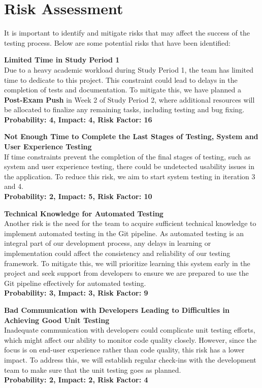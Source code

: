 \documentclass{article}
\begin{document}
\section{Risk Assessment}
It is important to identify and mitigate risks that may affect the success of the testing process. Below are some potential risks that have been identified:

\textbf{Limited Time in Study Period 1}\\
Due to a heavy academic workload during Study Period 1, the team has limited time to dedicate to this project. This constraint could lead to delays in the completion of tests and documentation. To mitigate this, we have planned a \textbf{Post-Exam Push} in Week 2 of Study Period 2, where additional resources will be allocated to finalize any remaining tasks, including testing and bug fixing.\\
\textbf{Probability: 4, Impact: 4, Risk Factor: 16}


\textbf{Not Enough Time to Complete the Last Stages of Testing, System and User Experience Testing}\\
If time constraints prevent the completion of the final stages of testing, such as system and user experience testing, there could be undetected usability issues in the application. To reduce this risk, we aim to start system testing in iteration 3 and 4.\\
\textbf{Probability: 2, Impact: 5, Risk Factor: 10}

\textbf{Technical Knowledge for Automated Testing}\\
Another risk is the need for the team to acquire sufficient technical knowledge to implement automated testing in the Git pipeline. As automated testing is an integral part of our development process, any delays in learning or implementation could affect the consistency and reliability of our testing framework. To mitigate this, we will prioritize learning this system early in the project and seek support from developers to ensure we are prepared to use the Git pipeline effectively for automated testing.\\
\textbf{Probability: 3, Impact: 3, Risk Factor: 9}

\textbf{Bad Communication with Developers Leading to Difficulties in Achieving Good Unit Testing}\\
Inadequate communication with developers could complicate unit testing efforts, which might affect our ability to monitor code quality closely. However, since the focus is on end-user experience rather than code quality, this risk has a lower impact. To address this, we will establish regular check-ins with the development team to make sure that the unit testing goes as planned.\\
\textbf{Probability: 2, Impact: 2, Risk Factor: 4}



\cite{tan2014introduction}

\newpage
\printbibliography
\end{document}
